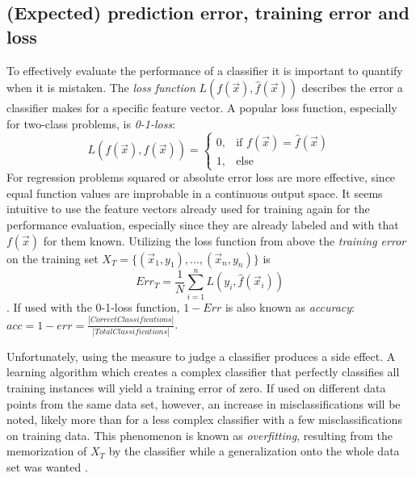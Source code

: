 \subsection{(Expected) prediction error, training error and loss}
To effectively evaluate the performance of a classifier it is important to quantify when it is mistaken. The \textit{loss function} $L(f(\vec{x}), \hat{f}(\vec{x}))$ describes the error a classifier makes for a specific feature vector. A popular loss function, especially for two-class problems, is \textit{0-1-loss}:
\begin{equation}
L(f(\vec{x}), \hat{f}(\vec{x})) =
\begin{cases}
	0, & \text{if }f(\vec{x}) = \hat{f}(\vec{x}) \\
	1, & \text{else}
\end{cases}
\end{equation}
For regression problems squared or absolute error loss are more effective, since equal function values are improbable in a continuous output space. It seems intuitive to use the feature vectors already used for training again for the performance evaluation, especially since they are already labeled and with that $f(\vec{x})$ for them known. Utilizing the loss function from above the \textit{training error} on the training set $X_T = \{(\vec{x}_1, y_1), ..., (\vec{x}_n, y_n)\}$ is
\begin{equation}
Err_{T} = \frac{1}{N}\sum_{i=1}^{n} L(y_i, \hat{f}(\vec{x}_i))
\end{equation}
\cite{HastieEtAl2009}. If used with the 0-1-loss function, $1 - Err$ is also known as \textit{accuracy}: $acc = 1 - err = \frac{|Correct Classifications|}{|Total Classifications|}$.

Unfortunately, using the measure to judge a classifier produces a side effect. A learning algorithm which creates a complex classifier that perfectly classifies all training instances will yield a training error of zero. If used on different data points from the same data set, however, an increase in misclassifications will be noted, likely more than for a less complex classifier with a few misclassifications on training data. This phenomenon is known as \textit{overfitting}, resulting from the memorization of $X_T$ by the classifier while a generalization onto the whole data set was wanted \cite{Dietterich1995}.

